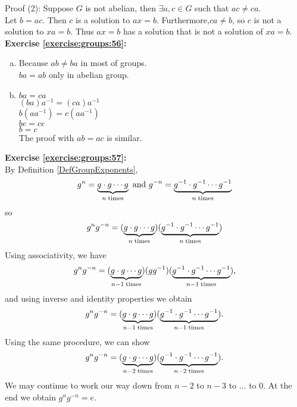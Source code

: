 \noindent Proof (2):
Suppose $G$ is not abelian, then $\exists a, c \in G$ such that $ac \neq ca$.\\
Let $b = ac$.  Then $c$ is a solution to $ax=b$. Furthermore,$ca \neq b$, so $c$ is not a solution to $xa = b$. Thus $ax=b$ has a solution that is not a solution of $xa=b$. 
\\

\noindent\textbf{Exercise \ref{exercise:groups:56}:}
\begin{enumerate}[(a)]
\item
Because $ab\neq ba$ in most of groups.\\
$ba=ab$ only in abelian group.

\item
$ba=ca$ \quad \quad [Given]\\
$(ba)a^{-1}=(ca)a^{-1}$ \quad \quad [Substitution] \\
$b(aa^{-1})=c(aa^{-1})$ \quad \quad [Associative] \\
$be=ce$ \quad \quad \quad [Inverse]\\
$b=c$ \quad \quad \quad [Identity]\\
The proof with $ab=ac$ is similar.
\end{enumerate}

\noindent\textbf{Exercise \ref{exercise:groups:57}:}
\\
By Definition \ref{DefGroupExponents},
\[
g^n =  \underbrace{g \cdot g \cdots g}_{n \; {\rm times}}
\  \text{and}\  
g^{-n} =  \underbrace{g^{-1} \cdot g^{-1} \cdots g^{-1}}_{n \; {\rm times}}
\]
so
\[ g^n g^{-n} = (\underbrace{g \cdot g \cdots g}_{n \; {\rm times}}) (\underbrace{g^{-1} \cdot g^{-1} \cdots g^{-1}}_{n \; {\rm times}})\]
Using associativity, we have
\[ g^n g^{-n} = (\underbrace{g \cdot g \cdots g}_{n-1 \; {\rm times}})(gg^{-1}) (\underbrace{g^{-1} \cdot g^{-1} \cdots g^{-1}}_{n-1 \; {\rm times}}),\]
and using inverse and identity properties we obtain
\[ g^n g^{-n} = (\underbrace{g \cdot g \cdots g}_{n-1 \; {\rm times}}) (\underbrace{g^{-1} \cdot g^{-1} \cdots g^{-1}}_{n-1 \; {\rm times}}).\]
Using the same procedure, we can show
\[ g^n g^{-n} = (\underbrace{g \cdot g \cdots g}_{n-2 \; {\rm times}}) (\underbrace{g^{-1} \cdot g^{-1} \cdots g^{-1}}_{n-2 \; {\rm times}}).\]
We may continue to work our way down from $n-2$ to $n-3$ to $\ldots$ to 0.  At the end we obtain $g^n g^{-n} = e$.  \\


